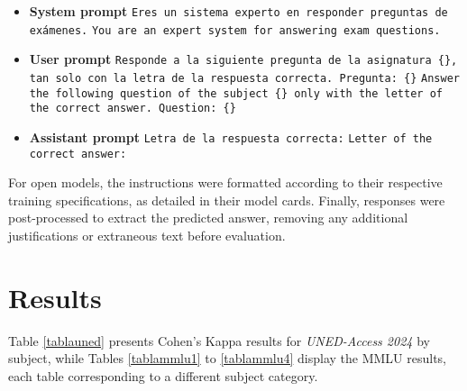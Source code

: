 {\small
\renewcommand{\labelitemi}{{\textcolor[HTML]{9999ff}{\scriptsize\ding{117}}}}
\begin{itemize}
\setlength\itemsep{0.01em}

\item {\bf System prompt}  \texttt{Eres un sistema experto en responder preguntas de exámenes.}  \texttt{You are an expert system for answering exam questions.}

\item {\bf User prompt}  \texttt{Responde a la siguiente pregunta de la asignatura \{\}, tan solo con la letra de la respuesta correcta. Pregunta: \{\}}  \texttt{Answer the following question of the subject \{\} only with the letter of the correct answer. Question: \{\}}

\item {\bf Assistant prompt}  \texttt{Letra de la respuesta correcta:}  \texttt{Letter of the correct answer:}
\end{itemize}
}



For open models, the instructions were formatted according to their respective training specifications, as detailed in their model cards. Finally, responses were post-processed to extract the predicted answer, removing any additional justifications or extraneous text before evaluation.







\section{Results}
\label{app-results}

Table \ref{tablauned} presents Cohen's Kappa results for \textit{UNED-Access 2024} by subject, while Tables \ref{tablammlu1} to \ref{tablammlu4} display the MMLU results, each table corresponding to a different subject category.

